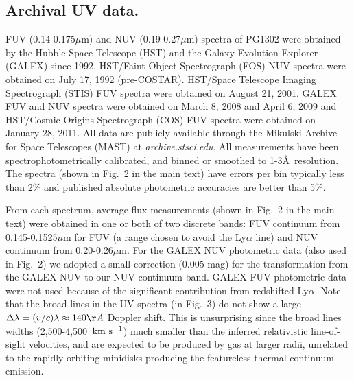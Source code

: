 \subsection{Archival UV data.}

FUV (0.14-0.175$\mu$m) and NUV (0.19-0.27$\mu$m) spectra of PG1302
were obtained by the Hubble Space Telescope (HST) and the Galaxy
Evolution Explorer (GALEX) since 1992.  HST/Faint Object Spectrograph
(FOS) NUV spectra were obtained on July 17, 1992
(pre-COSTAR)\cite{EvansKoratkar2004}.  HST/Space Telescope Imaging
Spectrograph (STIS) FUV spectra were obtained on August 21,
2001\cite{Cooksey+2008}. GALEX FUV and NUV spectra were obtained on
March 8, 2008 and April 6, 2009 and HST/Cosmic Origins Spectrograph
(COS) FUV spectra were obtained on January 28, 2011. All data are
publicly available through the Mikulski Archive for Space Telescopes
(MAST) at {\it archive.stsci.edu}.  All measurements have been
spectrophotometrically calibrated, and binned or smoothed to
1-3\AA\ resolution.  The spectra (shown in Fig.~2 in the main text)
have errors per bin typically less than 2\% and published absolute
photometric accuracies are better than 5\%. 

From each spectrum, average flux measurements (shown in Fig.~2 in the
main text) were obtained in one or both of two discrete bands: FUV
continuum from 0.145-0.1525$\mu$m for FUV (a range chosen to avoid the
Ly$\alpha$ line) and NUV continuum from 0.20-0.26$\mu$m.  For the
GALEX NUV photometric data (also used in Fig.~2) we adopted a small
correction (0.005 mag) for the transformation from the GALEX NUV to
our NUV continuum band.  GALEX FUV photometric data were not used
because of the significant contribution from redshifted
Ly$\alpha$. Note that the broad lines in the UV spectra (in Fig.~3) do
not show a large $\Delta\lambda=(v/c)\lambda\approx 140\AA$ Doppler
shift. This is unsurprising since the broad lines widths
(2,500-4,500~${\rm km~s^{-1}}$) much smaller than the inferred
relativistic line-of-sight velocities, and are expected to be produced
by gas at larger radii, unrelated to the rapidly orbiting minidisks
producing the featureless thermal continuum emission\cite{PG1302MNRAS:2015a}.

\vspace{2\baselineskip}


